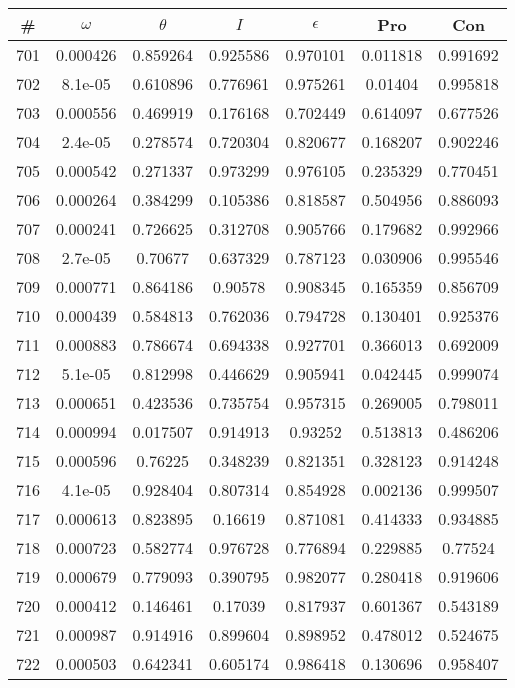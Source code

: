 \newpage
\begin{table}
\begin{tabular}{c|c|c|c|c|c|c}
\# & $\omega$ & $\theta$ & $I$ & $\epsilon$ & Pro & Con\\
\hline
701 & 0.000426 & 0.859264 & 0.925586 & 0.970101 & 0.011818 & 0.991692\\
702 & 8.1e-05 & 0.610896 & 0.776961 & 0.975261 & 0.01404 & 0.995818\\
703 & 0.000556 & 0.469919 & 0.176168 & 0.702449 & 0.614097 & 0.677526\\
704 & 2.4e-05 & 0.278574 & 0.720304 & 0.820677 & 0.168207 & 0.902246\\
705 & 0.000542 & 0.271337 & 0.973299 & 0.976105 & 0.235329 & 0.770451\\
706 & 0.000264 & 0.384299 & 0.105386 & 0.818587 & 0.504956 & 0.886093\\
707 & 0.000241 & 0.726625 & 0.312708 & 0.905766 & 0.179682 & 0.992966\\
708 & 2.7e-05 & 0.70677 & 0.637329 & 0.787123 & 0.030906 & 0.995546\\
709 & 0.000771 & 0.864186 & 0.90578 & 0.908345 & 0.165359 & 0.856709\\
710 & 0.000439 & 0.584813 & 0.762036 & 0.794728 & 0.130401 & 0.925376\\
711 & 0.000883 & 0.786674 & 0.694338 & 0.927701 & 0.366013 & 0.692009\\
712 & 5.1e-05 & 0.812998 & 0.446629 & 0.905941 & 0.042445 & 0.999074\\
713 & 0.000651 & 0.423536 & 0.735754 & 0.957315 & 0.269005 & 0.798011\\
714 & 0.000994 & 0.017507 & 0.914913 & 0.93252 & 0.513813 & 0.486206\\
715 & 0.000596 & 0.76225 & 0.348239 & 0.821351 & 0.328123 & 0.914248\\
716 & 4.1e-05 & 0.928404 & 0.807314 & 0.854928 & 0.002136 & 0.999507\\
717 & 0.000613 & 0.823895 & 0.16619 & 0.871081 & 0.414333 & 0.934885\\
718 & 0.000723 & 0.582774 & 0.976728 & 0.776894 & 0.229885 & 0.77524\\
719 & 0.000679 & 0.779093 & 0.390795 & 0.982077 & 0.280418 & 0.919606\\
720 & 0.000412 & 0.146461 & 0.17039 & 0.817937 & 0.601367 & 0.543189\\
721 & 0.000987 & 0.914916 & 0.899604 & 0.898952 & 0.478012 & 0.524675\\
722 & 0.000503 & 0.642341 & 0.605174 & 0.986418 & 0.130696 & 0.958407\\

\end{tabular}
\end{table}
